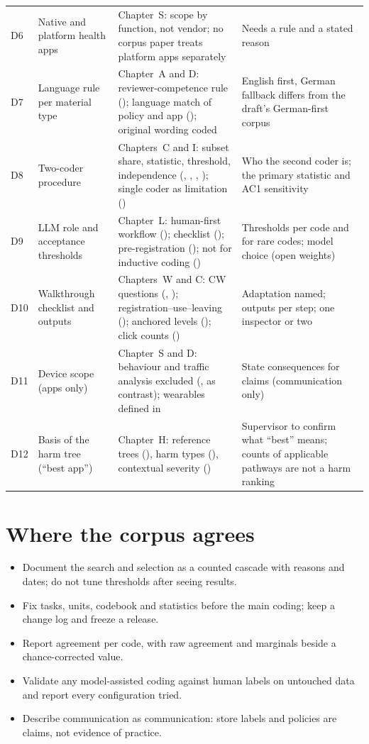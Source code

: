 \begin{longtable}{@{}P{0.9cm}P{3.2cm}P{4.5cm}P{4.9cm}@{}}
D6 & Native and platform health apps & Chapter~S: scope by function, not vendor; no corpus paper treats platform apps separately & Needs a rule and a stated reason\\
D7 & Language rule per material type & Chapter~A and D: reviewer-competence rule (); language match of policy and app (); original wording coded & English first, German fallback differs from the draft's German-first corpus\\
D8 & Two-coder procedure & Chapters~C and I: subset share, statistic, threshold, independence (, , , ); single coder as limitation () & Who the second coder is; the primary statistic and AC1 sensitivity\\
D9 & LLM role and acceptance thresholds & Chapter~L: human-first workflow (); checklist (); pre-registration (); not for inductive coding () & Thresholds per code and for rare codes; model choice (open weights)\\
D10 & Walkthrough checklist and outputs & Chapters~W and C: CW questions (, ); registration--use--leaving (); anchored levels (); click counts () & Adaptation named; outputs per step; one inspector or two\\
D11 & Device scope (apps only) & Chapter~S and D: behaviour and traffic analysis excluded (,  as contrast); wearables defined in  & State consequences for claims (communication only)\\
D12 & Basis of the harm tree (``best app'') & Chapter~H: reference trees (), harm types (), contextual severity () & Supervisor to confirm what ``best'' means; counts of applicable pathways are not a harm ranking\\
\bottomrule
\end{longtable}

\section{Where the corpus agrees}
\begin{itemize}
\item Document the search and selection as a counted cascade with reasons and dates; do not tune thresholds after seeing results.
\item Fix tasks, units, codebook and statistics before the main coding; keep a change log and freeze a release.
\item Report agreement per code, with raw agreement and marginals beside a chance-corrected value.
\item Validate any model-assisted coding against human labels on untouched data and report every configuration tried.
\item Describe communication as communication: store labels and policies are claims, not evidence of practice.
\end{itemize}

